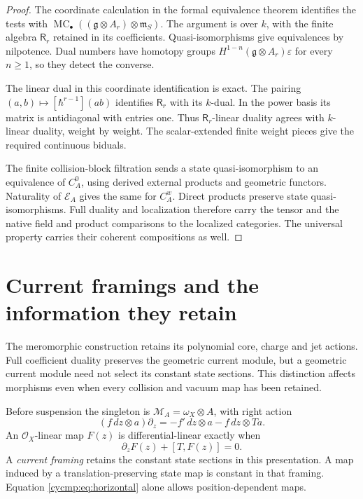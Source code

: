 \begin{proof}
The coordinate calculation in the formal equivalence theorem
identifies the tests with
$\operatorname{MC}_\bullet((\mathfrak g\otimes A_r)\otimes\mathfrak m_S)$.
The argument is over $k$, with the finite algebra $\mathsf R_r$
retained in its coefficients. Quasi-isomorphisms give equivalences
by nilpotence. Dual numbers have homotopy groups
$H^{1-n}(\mathfrak g\otimes A_r)\varepsilon$ for every $n\ge1$,
so they detect the converse.

The linear dual in this coordinate identification is exact.
The pairing $(a,b)\mapsto[\hbar^{r-1}](ab)$ identifies
$\mathsf R_r$ with its $k$-dual. In the power basis its matrix
is antidiagonal with entries one. Thus $\mathsf R_r$-linear duality
agrees with $k$-linear duality, weight by weight. The scalar-extended
finite weight pieces give the required continuous biduals.

The finite collision-block filtration sends a state
quasi-isomorphism to an equivalence of $C_A^0$, using derived
external products and geometric functors. Naturality of
$\mathscr E_A$ gives the same for $C_A^w$. Direct products preserve
state quasi-isomorphisms. Full duality and localization therefore
carry the tensor and the native field and product comparisons to
the localized categories. The universal property carries their
coherent compositions as well.
\end{proof}

\section{Current framings and the information they retain}
\label{cycmp:sec:framing}

The meromorphic construction retains its polynomial core, charge
and jet actions. Full coefficient duality preserves the geometric
current module, but a geometric current module need not select its
constant state sections. This distinction affects morphisms even
when every collision and vacuum map has been retained.

Before suspension the singleton is
$\mathscr M_A=\omega_X\otimes A$, with right action
\[
 (f\,dz\otimes a)\partial_z
       =-f'\,dz\otimes a-f\,dz\otimes Ta.
\]
An $\mathcal O_X$-linear map $F(z)$ is differential-linear exactly
when
\begin{equation}\label{cycmp:eq:horizontal}
 \partial_zF(z)+[T,F(z)]=0.
\end{equation}
A \emph{current framing} retains the constant state sections in
this presentation. A map induced by a translation-preserving state
map is constant in that framing. Equation \eqref{cycmp:eq:horizontal}
alone allows position-dependent maps.

